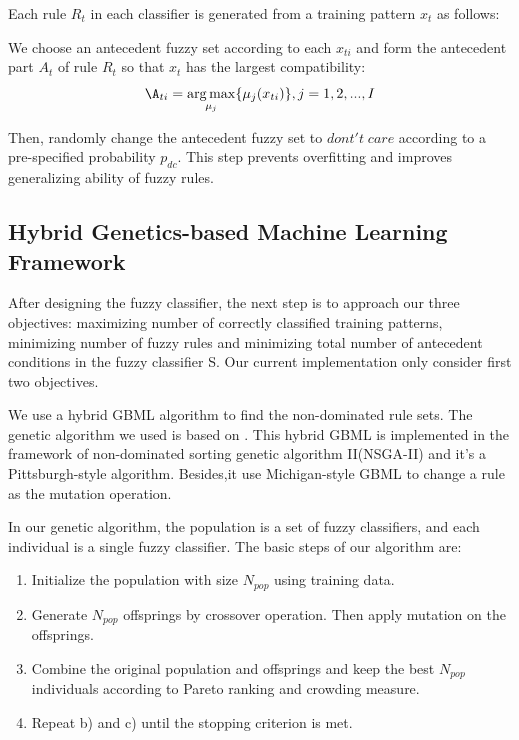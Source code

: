 \documentclass[conference]{IEEEtran}
\begin{document}
  Each rule $R_t$ in each classifier is generated from a training pattern $x_t$ as follows:

  We choose an antecedent fuzzy set according to each $x_{ti}$ and form the antecedent part $A_t$ of rule $R_t$ so that $x_{t}$ has the largest compatibility:
  \begin{equation} \A_{ti} = \underset{\mu_j}{\arg\max}\{\mu_{j}(x_{ti})\},j=1,2,...,I\end{equation}
  
  Then, randomly change the antecedent fuzzy set to $dont't\;care$ according to a pre-specified probability $p_{dc}$. This step prevents overfitting and improves generalizing ability of fuzzy rules.
  \subsection{Hybrid Genetics-based Machine Learning Framework}
  After designing the fuzzy classifier, the next step is to approach our three objectives: maximizing number of correctly classified training patterns, minimizing number of fuzzy rules and minimizing total number of antecedent conditions in the fuzzy classifier S. Our current implementation only consider first two objectives.
	 
  We use a hybrid GBML algorithm to find the non-dominated rule sets. The genetic algorithm we used is based on \cite{ishibuchi2007analysis}. This hybrid GBML is implemented in the framework of non-dominated sorting genetic algorithm II(NSGA-II) and it's a Pittsburgh-style algorithm. Besides,it use Michigan-style GBML to change a rule as the mutation operation. 
	 
  In our genetic algorithm, the population is a set of fuzzy classifiers, and each individual is a single fuzzy classifier. The basic steps of our algorithm are:
  \begin{enumerate}[label=\alph*)]
  \item Initialize the population with size $N_{pop}$ using training data.
  \item Generate $N_{pop}$ offsprings by crossover operation. Then apply mutation on the offsprings.
  \item Combine the original population and offsprings and keep the best $N_{pop}$ individuals according to Pareto ranking and crowding measure.
  \item Repeat b) and c) until the stopping criterion is met.
  \end{enumerate}
  
\end{document}
